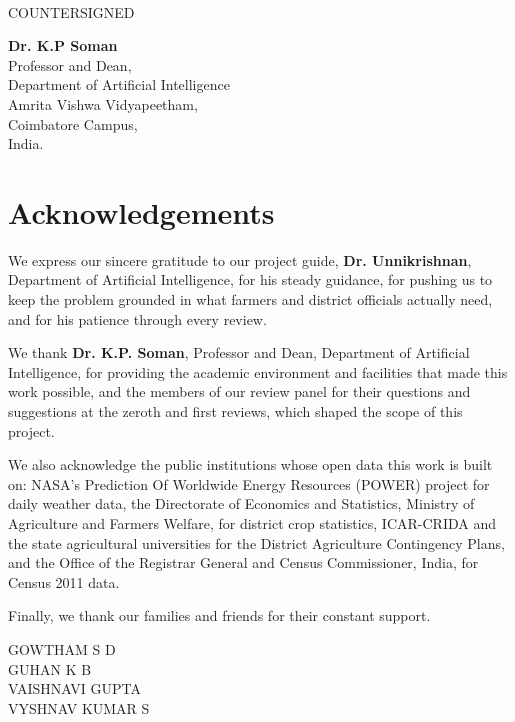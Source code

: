 \documentclass[a4paper, 12pt]{report}
\renewcommand{\_}{\textunderscore\allowbreak}
\theoremstyle{definition}
\begin{document}
	\vspace*{1cm}
	 \\
	\vfill
	\begin{center}
		\large{COUNTERSIGNED}\\
	\end{center}
	\vspace{0.6in}

\begin{center}
		\textbf{Dr. K.P Soman}\\
	Professor and Dean, \\
	Department of Artificial Intelligence \\ Amrita Vishwa Vidyapeetham,\\
	Coimbatore Campus,\\
	India.
\end{center}

	\clearpage
	\tableofcontents

	\chapter*{Acknowledgements}
	We express our sincere gratitude to our project guide, \textbf{Dr. Unnikrishnan}, Department of Artificial Intelligence, for his steady guidance, for pushing us to keep the problem grounded in what farmers and district officials actually need, and for his patience through every review.

	We thank \textbf{Dr. K.P. Soman}, Professor and Dean, Department of Artificial Intelligence, for providing the academic environment and facilities that made this work possible, and the members of our review panel for their questions and suggestions at the zeroth and first reviews, which shaped the scope of this project.

	We also acknowledge the public institutions whose open data this work is built on: NASA's Prediction Of Worldwide Energy Resources (POWER) project for daily weather data, the Directorate of Economics and Statistics, Ministry of Agriculture and Farmers Welfare, for district crop statistics, ICAR-CRIDA and the state agricultural universities for the District Agriculture Contingency Plans, and the Office of the Registrar General and Census Commissioner, India, for Census 2011 data.

	Finally, we thank our families and friends for their constant support.\\
	\vspace{1cm}
	\begin{flushright}
		GOWTHAM S D\\
		GUHAN K B\\
		VAISHNAVI GUPTA\\
		VYSHNAV KUMAR S
	\end{flushright}
	\listoffigures
	\listoftables
	\newpage
\end{document}
